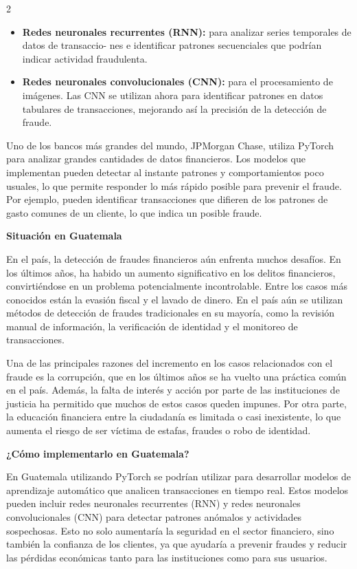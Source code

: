 \documentclass[12pt,spanish,Letterpaper,openany]{book}
\begin{document}
\begin {multicols}{2}
\begin{itemize}
\item
  \textbf{Redes neuronales recurrentes (RNN):} para analizar series temporales de datos de transaccio-
  nes e identificar patrones secuenciales que podrían indicar actividad fraudulenta.
\item
  \textbf{Redes neuronales convolucionales (CNN):} para el procesamiento de imágenes. Las CNN se utilizan ahora para identificar patrones en datos tabulares de transacciones, mejorando así la precisión de la detección de fraude.
\end{itemize}

Uno de los bancos más grandes del mundo, JPMorgan Chase, utiliza PyTorch para analizar grandes cantidades de datos financieros. Los modelos que implementan pueden detectar al instante patrones y comportamientos poco usuales, lo que permite responder lo más rápido posible para prevenir el fraude. Por ejemplo, pueden identificar transacciones que difieren de los patrones de gasto comunes de un cliente, lo que indica un posible fraude.

\textbf{Situación en Guatemala}

En el país, la detección de fraudes financieros aún enfrenta muchos desafíos. En los últimos años, ha habido un aumento significativo en los delitos financieros, convirtiéndose en un problema potencialmente incontrolable. Entre los casos más conocidos están la evasión fiscal y el lavado de dinero. En el país aún se utilizan métodos de detección de fraudes tradicionales en su mayoría, como la revisión manual de información, la verificación de identidad y el monitoreo de transacciones.

Una de las principales razones del incremento en los casos relacionados con el fraude es la corrupción, que en los últimos años se ha vuelto una práctica común en el país. Además, la falta de interés y acción por parte de las instituciones de justicia ha permitido que muchos de estos casos queden impunes. Por otra parte, la educación financiera entre la ciudadanía es limitada o casi inexistente, lo que aumenta el riesgo de ser víctima de estafas, fraudes o robo de identidad.

\bigskip
\bigskip
\bigskip
\bigskip

\textbf{¿Cómo implementarlo en Guatemala?}

En Guatemala utilizando PyTorch se podrían utilizar para desarrollar modelos de aprendizaje automático que analicen transacciones en tiempo real. Estos modelos pueden incluir redes neuronales recurrentes (RNN) y redes neuronales convolucionales (CNN) para detectar patrones anómalos y actividades sospechosas. Esto no solo aumentaría la seguridad en el sector financiero, sino también la confianza de los clientes, ya que ayudaría a prevenir fraudes y reducir las pérdidas económicas tanto para las instituciones como para sus usuarios.


\end{multicols}
\end{document}
